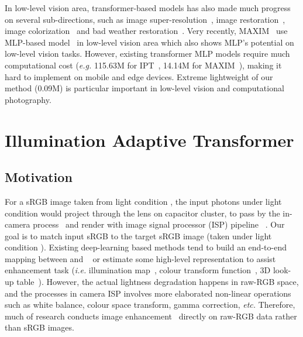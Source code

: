 \documentclass{bmvc2k}
\begin{document}
In low-level vision area, transformer-based models has also made much progress on several sub-directions, such as image super-resolution~\cite{liang2021swinir}, image restoration~\cite{zamir2021restormer,Wang2022Uformer,IPT_CVPR}, image colorization~\cite{kumar2021colorization} and bad weather restoration~\cite{TransWeather}. 
Very recently, MAXIM~\cite{MLP_enhancement} use MLP-based model~\cite{mlpmixer} in low-level vision area which also shows MLP's potential on low-level vision tasks. However, existing transformer  MLP models require much computational cost (\textit{e.g.} 115.63M for IPT~\cite{IPT_CVPR}, 14.14M for MAXIM~\cite{MLP_enhancement}), making it hard to implement on mobile and edge devices. Extreme lightweight of our method (0.09M) is particular important in low-level vision and computational photography.



\vspace{-1mm}
\section{Illumination Adaptive Transformer}
\vspace{-1mm}
\subsection{Motivation}
\label{sec:physic_ana}

For a sRGB image  taken from light condition , the input photons under light condition  would project through the lens on capacitor cluster, to pass by the in-camera process~\cite{CVPRLow_light_denoise_physics} and render with image signal processor (ISP) pipeline ~\cite{ISP_pipeline_eccv16,brooks2019unprocessing}. Our goal is to match input sRGB   to the target sRGB image  (taken under light condition ). Existing deep-learning based methods tend to build an end-to-end mapping between  and ~\cite{LLNet,Lv2018MBLLEN,Exposure_2021_CVPR} or estimate some high-level representation to assist enhancement task (\textit{i.e.} illumination map~\cite{DeepUPE_2019_CVPR}, colour transform function~\cite{RCT_ICCV21}, 3D look-up table~\cite{3DLUT}). However, the actual lightness degradation happens in raw-RGB space, and the processes in camera ISP involves more elaborated non-linear operations such as white balance, colour space transform, gamma correction, \textit{etc.}
Therefore, much of research conducts image enhancement~\cite{see_in_the_dark,CVPRLow_light_denoise_physics} directly on raw-RGB data rather than sRGB images.
\end{document}
